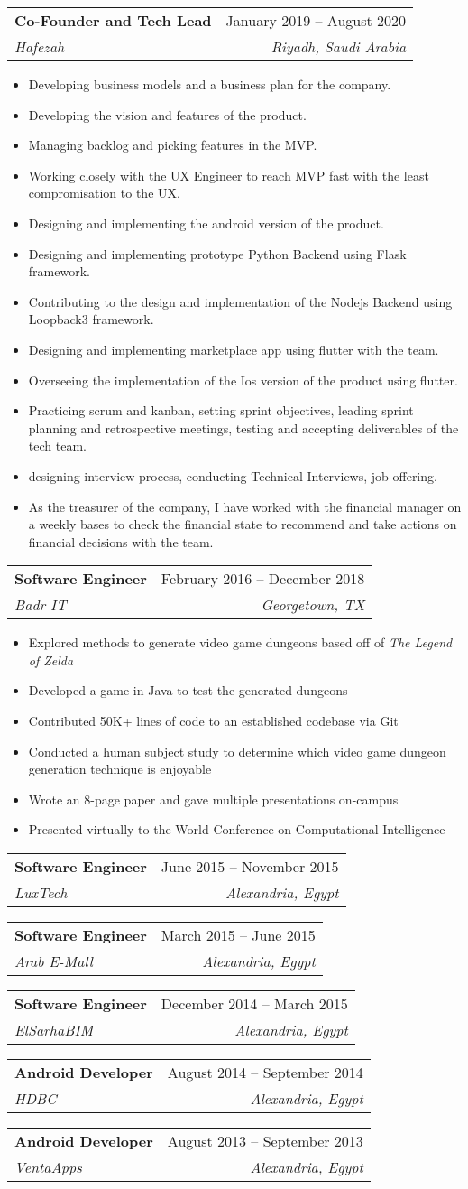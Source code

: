 \documentclass[letterpaper,11pt]{article}
\makeatletter
\newcommand{\resumeItem}[1]{
  \item\small{
    {#1 \vspace{-2pt}}
  }
}
\newcommand{\resumeSubheading}[4]{
  \vspace{-2pt}\item
    \begin{tabular*}{0.97\textwidth}[t]{l@{\extracolsep{\fill}}r}
      \textbf{#1} & #2 \\
      \textit{\small#3} & \textit{\small #4} \\
    \end{tabular*}\vspace{-7pt}
}
\newcommand{\resumeItemListStart}{\begin{itemize}}
\newcommand{\resumeItemListEnd}{\end{itemize}\vspace{-5pt}}
\makeatother
\begin{document}
    
    \resumeSubheading
      {Co-Founder and Tech Lead}{January 2019 -- August 2020}
      {Hafezah}{Riyadh, Saudi Arabia}
      \resumeItemListStart 
        \resumeItem{ Developing business models and a business plan for the company.}         
        \resumeItem{ Developing the vision and features of the product.}
        \resumeItem{ Managing backlog and picking features in the MVP.}
        \resumeItem{ Working closely with the UX Engineer to reach MVP fast with the least compromisation to the UX.}        
        \resumeItem{ Designing and implementing the android version of the product.}
        \resumeItem{ Designing and implementing prototype Python Backend using Flask framework.}         \resumeItem{ Contributing to the design and implementation of the Nodejs Backend using Loopback3 framework.}
        \resumeItem{ Designing and implementing marketplace app using ﬂutter with the team.}         \resumeItem{ Overseeing the implementation of the Ios version of the product using ﬂutter.}         \resumeItem{ Practicing scrum and kanban, setting sprint objectives, leading sprint planning and retrospective meetings, testing and accepting deliverables of the tech team.}         
        \resumeItem{ designing interview process, conducting Technical Interviews, job oﬀering.}         \resumeItem{ As the treasurer of the company, I have worked with the ﬁnancial manager on a weekly bases to check the ﬁnancial state to recommend and take actions on ﬁnancial decisions with the team.}
      \resumeItemListEnd
    \resumeSubheading
      {Software Engineer}{February 2016 -- December 2018}
      {Badr IT}{Georgetown, TX}
      \resumeItemListStart
        \resumeItem{Explored methods to generate video game dungeons based off of \emph{The Legend of Zelda}}
        \resumeItem{Developed a game in Java to test the generated dungeons}
        \resumeItem{Contributed 50K+ lines of code to an established codebase via Git}
        \resumeItem{Conducted  a human subject study to determine which video game dungeon generation technique is enjoyable}
        \resumeItem{Wrote an 8-page paper and gave multiple presentations on-campus}
        \resumeItem{Presented virtually to the World Conference on Computational Intelligence}
      \resumeItemListEnd
      \resumeSubheading
      {Software Engineer}{June 2015 -- November 2015}
      {LuxTech}{Alexandria, Egypt}
      
      \resumeSubheading
      {Software Engineer}{March 2015 -- June 2015}
      {Arab E-Mall}{Alexandria, Egypt}
      \resumeSubheading
      {Software Engineer}{December 2014 -- March 2015}
      {ElSarhaBIM}{Alexandria, Egypt}
      \resumeSubheading
      {Android Developer}{August 2014 -- September 2014}
      {HDBC}{Alexandria, Egypt}
      \resumeSubheading
      {Android Developer}{August 2013 -- September 2013}
      {VentaApps}{Alexandria, Egypt}
      
\end{document}

